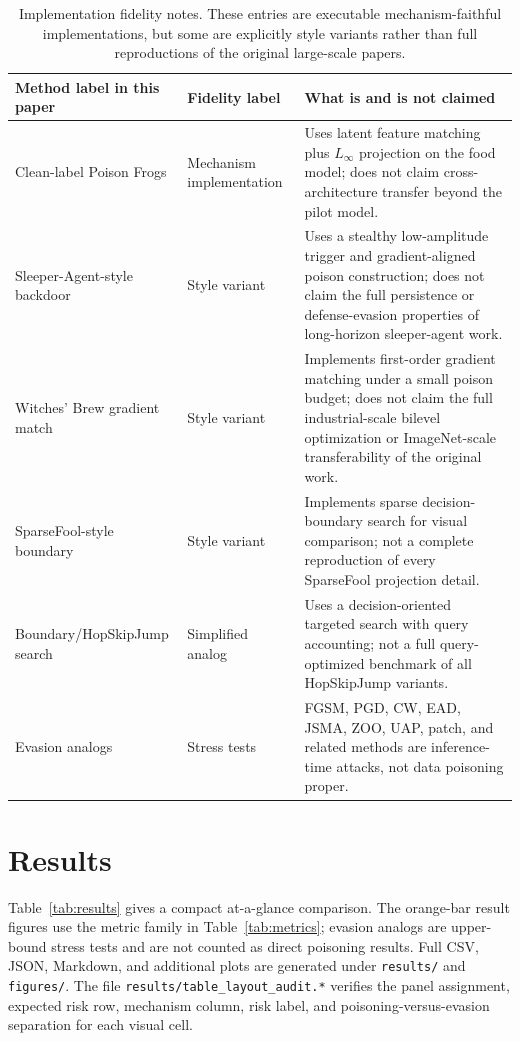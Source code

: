 \documentclass[conference]{IEEEtran}
\begin{document}
\begin{table}[t]
\centering
\caption{Implementation fidelity notes. These entries are executable mechanism-faithful implementations, but some are explicitly style variants rather than full reproductions of the original large-scale papers.}
\label{tab:fidelity}
\small
\begin{tabular}{p{}p{}p{}}
\toprule
Method label in this paper & Fidelity label & What is and is not claimed \\
\midrule
Clean-label Poison Frogs & Mechanism implementation & Uses latent feature matching plus \(L_\infty\) projection on the food model; does not claim cross-architecture transfer beyond the pilot model. \\
Sleeper-Agent-style backdoor & Style variant & Uses a stealthy low-amplitude trigger and gradient-aligned poison construction; does not claim the full persistence or defense-evasion properties of long-horizon sleeper-agent work. \\
Witches' Brew gradient match & Style variant & Implements first-order gradient matching under a small poison budget; does not claim the full industrial-scale bilevel optimization or ImageNet-scale transferability of the original work. \\
SparseFool-style boundary & Style variant & Implements sparse decision-boundary search for visual comparison; not a complete reproduction of every SparseFool projection detail. \\
Boundary/HopSkipJump search & Simplified analog & Uses a decision-oriented targeted search with query accounting; not a full query-optimized benchmark of all HopSkipJump variants. \\
Evasion analogs & Stress tests & FGSM, PGD, CW, EAD, JSMA, ZOO, UAP, patch, and related methods are inference-time attacks, not data poisoning proper. \\
\bottomrule
\end{tabular}
\end{table}

\section{Results}

Table~\ref{tab:results} gives a compact at-a-glance comparison. The orange-bar result figures use the metric family in Table~\ref{tab:metrics}; evasion analogs are upper-bound stress tests and are not counted as direct poisoning results. Full CSV, JSON, Markdown, and additional plots are generated under \texttt{results/} and \texttt{figures/}. The file \texttt{results/table\_layout\_audit.*} verifies the panel assignment, expected risk row, mechanism column, risk label, and poisoning-versus-evasion separation for each visual cell.
\end{document}
